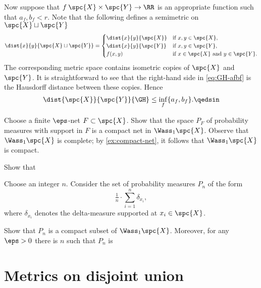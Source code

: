 Now suppose that $f\:\spc{X}\times\spc{Y}\to\RR$ is an appropriate function such that 
$a_f,b_f<r$.
Note that the following defines a semimetric on $\spc{X}\sqcup\spc{Y}$
\[\dist{x}{y}{\spc{X}\sqcup\spc{Y}}=
\begin{cases}
\dist{x}{y}{\spc{X}}&\text{if\ } x,y\in \spc{X},
\\
\dist{x}{y}{\spc{Y}}&\text{if\ } x,y\in \spc{Y},
\\
f(x,y)&\text{if\ } x\in \spc{X}\ \text{and}\ y\in \spc{Y}.
\end{cases}
\]
The corresponding metric space contains isometric copies of $\spc{X}$ and $\spc{Y}$.
It is straightforward to see that the right-hand side in \ref{eq:GH-afbf} is the Hausdorff distance between these copies.
Hence 
\[\dist{\spc{X}}{\spc{Y}}{\GH}\le\inf_f\{a_f,b_f\}.\qedsin\]

















Choose a finite $\eps$-net $F\subset\spc{X}$.
Show that the space $P_F$ of probability measures with support in $F$ is a compact net in $\Wass_1\spc{X}$.
Observe that $\Wass_1\spc{X}$ is complete; 
by \ref{ex:compact-net}, it follows that $\Wass_1\spc{X}$ is compact.

Show that 

Choose an integer $n$.
Consider the set of probability measures $P_n$ of the form 
\[\tfrac1n\cdot\sum_{i=1}^n\delta_{x_i},\]
where $\delta_{x_i}$ denotes the delta-measure supported at $x_i\in\spc{X}$. 

Show that $P_n$ is a compact subset of $\Wass_1\spc{X}$.
Moreover, for any $\eps>0$ there is $n$ such that $P_n$ is 





















\section{Metrics on disjoint union}

